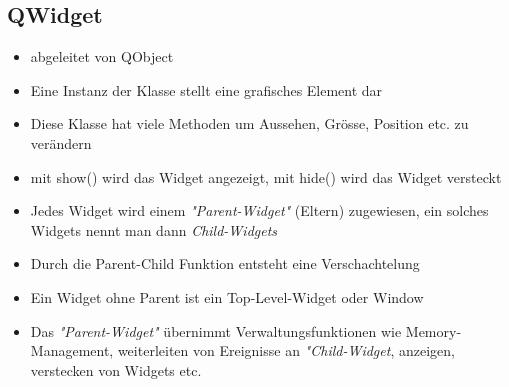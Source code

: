 \subsection{QWidget}
\begin{itemize}
	\item abgeleitet von QObject
	\item Eine Instanz der Klasse stellt eine grafisches Element dar
	\item Diese Klasse hat viele Methoden um Aussehen, Grösse, Position etc. zu verändern
	\item mit show() wird das Widget angezeigt, mit hide() wird das Widget versteckt
	\item Jedes Widget wird einem \textit{"Parent-Widget"} (Eltern) zugewiesen, ein solches Widgets nennt man dann \textit{Child-Widgets}
	\item Durch die Parent-Child Funktion entsteht eine Verschachtelung
	\item Ein Widget ohne Parent ist ein Top-Level-Widget oder Window	
	\item Das \textit{"Parent-Widget"} übernimmt Verwaltungsfunktionen wie Memory-Management, weiterleiten von Ereignisse an \textit{"Child-Widget}, anzeigen, verstecken von Widgets etc.
\end{itemize}


